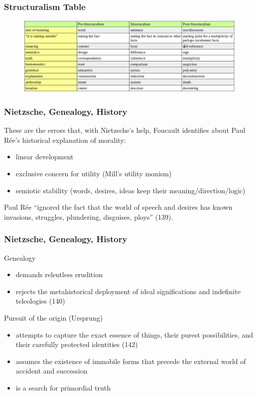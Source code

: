 \documentclass[xcolor=dvipsnames]{beamer}
\begin{document}
\begin{frame}
  \frametitle{Structuralism Table}
\begin{figure}[h]
\includegraphics[scale=.3]{./structable.png}
\end{figure}
\end{frame}

\begin{frame}
  \frametitle{Nietzsche, Genealogy, History}
  These are the errors that, with Nietzsche's help, Foucault
  identifies about Paul R{\'e}e's historical explanation of morality:
  \begin{itemize}
  \item linear development
  \item exclusive concern for utility (Mill's utility monism)
  \item semiotic stability (words, desires, ideas keep their meaning/direction/logic)
  \end{itemize}
  Paul R{\'e}e ``ignored the fact that the world of speech and desires
  has known invasions, struggles, plundering, disguises, ploys'' (139).
\end{frame}

\begin{frame}
  \frametitle{Nietzsche, Genealogy, History}
  Genealogy
  \begin{itemize}
  \item demands relentless erudition
  \item rejects the metahistorical deployment of ideal significations
    and indefinite teleologies (140)
  \end{itemize}
  Pursuit of the origin (Ursprung)
  \begin{itemize}
  \item attempts to capture the exact essence of things, their purest
    possibilities, and their carefully protected identities (142)
  \item assumes the existence of immobile forms that precede the
    external world of accident and succession
  \item is a search for primordial truth
  \end{itemize}
\end{frame}
\end{document}
